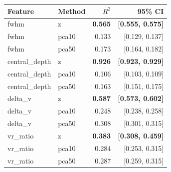 \begin{tabular}{llrr}
  \toprule
  Feature & Method & $R^2$ & 95\% CI \\
  \midrule
  fwhm                 & z     & \textbf{0.565} & \textbf{[0.555, 0.575]} \\
  fwhm                 & pca10 & 0.133 & [0.129, 0.137] \\
  fwhm                 & pca50 & 0.173 & [0.164, 0.182] \\
  \midrule
  central\_depth       & z     & \textbf{0.926} & \textbf{[0.923, 0.929]} \\
  central\_depth       & pca10 & 0.106 & [0.103, 0.109] \\
  central\_depth       & pca50 & 0.163 & [0.151, 0.175] \\
  \midrule
  delta\_v             & z     & \textbf{0.587} & \textbf{[0.573, 0.602]} \\
  delta\_v             & pca10 & 0.248 & [0.238, 0.258] \\
  delta\_v             & pca50 & 0.308 & [0.301, 0.315] \\
  \midrule
  vr\_ratio            & z     & \textbf{0.383} & \textbf{[0.308, 0.459]} \\
  vr\_ratio            & pca10 & 0.284 & [0.253, 0.315] \\
  vr\_ratio            & pca50 & 0.287 & [0.259, 0.315] \\

  \bottomrule
\end{tabular}
